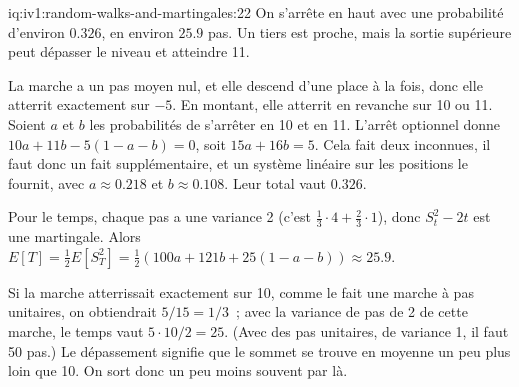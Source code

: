\begin{solution}{iq:iv1:random-walks-and-martingales:22}
On s'arrête en haut avec une probabilité d'environ $0.326$, en environ $25.9$ pas. Un tiers est proche, mais la sortie supérieure peut dépasser le niveau et atteindre 11.

La marche a un pas moyen nul, et elle descend d'une place à la fois, donc elle atterrit exactement sur $-5$. En montant, elle atterrit en revanche sur 10 ou 11. Soient $a$ et $b$ les probabilités de s'arrêter en 10 et en 11. L'arrêt optionnel donne $10a + 11b - 5(1 - a - b) = 0$, soit $15a + 16b = 5$. Cela fait deux inconnues, il faut donc un fait supplémentaire, et un système linéaire sur les positions le fournit, avec $a \approx 0.218$ et $b \approx 0.108$. Leur total vaut $0.326$.

Pour le temps, chaque pas a une variance 2 (c'est $\tfrac13 \cdot 4 + \tfrac23 \cdot 1$), donc $S_t^2 - 2t$ est une martingale. Alors $E[T] = \tfrac12 E[S_T^2] = \tfrac12(100a + 121b + 25(1 - a - b)) \approx 25.9$.

Si la marche atterrissait exactement sur 10, comme le fait une marche à pas unitaires, on obtiendrait $5/15 = 1/3$~; avec la variance de pas de 2 de cette marche, le temps vaut $5 \cdot 10/2 = 25$. (Avec des pas unitaires, de variance 1, il faut 50 pas.) Le dépassement signifie que le sommet se trouve en moyenne un peu plus loin que 10. On sort donc un peu moins souvent par là.

\end{solution}

